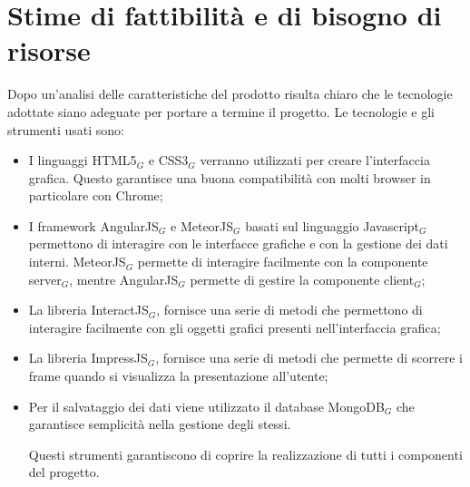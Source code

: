 \newpage
\section{Stime di fattibilità e di bisogno di risorse}
Dopo un'analisi delle caratteristiche del prodotto risulta chiaro che le tecnologie adottate siano adeguate per portare a termine il progetto.
Le tecnologie e gli strumenti usati sono:
\begin{itemize}
\item I linguaggi HTML5$_G$ e CSS3$_G$ verranno utilizzati per creare l'interfaccia grafica. Questo garantisce una buona compatibilità con molti browser in particolare con Chrome;
\item I framework AngularJS$_G$ e MeteorJS$_G$ basati sul linguaggio Javascript$_G$ permettono di interagire con le interfacce grafiche e con la gestione dei dati interni. MeteorJS$_G$ permette di interagire facilmente con la componente server$_G$, mentre AngularJS$_G$ permette di gestire la componente client$_G$;
\item La libreria InteractJS$_G$, fornisce una serie di metodi che permettono di interagire facilmente con gli oggetti grafici presenti nell'interfaccia grafica;
\item La libreria ImpressJS$_G$, fornisce una serie di metodi che permette di scorrere i frame quando si visualizza la presentazione all'utente;
\item Per il salvataggio dei dati viene utilizzato il database MongoDB$_G$ che garantisce semplicità nella gestione degli stessi.

Questi strumenti garantiscono di coprire la realizzazione di tutti i componenti del progetto.   
\end{itemize}